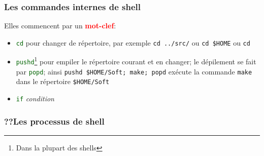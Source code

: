 \documentclass[lualatex,11pt,a4paper,svgnames,french]{beamer}
\newcommand{\clbrougras}[1]{{\textcolor{Red}{\textbf{#1}}}}
\newcommand{\clbshell}[1]{{\textcolor{DarkGreen}{\texttt{#1}}}}
\begin{document}
\begin{frame}\frametitle{Les commandes internes de shell}
  Elles commencent par un \clbrougras{mot-clef}:
  \begin{itemize}
  \item \clbshell{cd} pour changer de répertoire, par exemple
    \texttt{cd ../src/} ou \texttt{cd \$HOME} ou \texttt{cd ~}
    \item \clbshell{pushd}\footnote{Dans la plupart des shells} pour
      empiler le répertoire courant et en changer; le dépilement se
      fait par \clbshell{popd}; ainsi \texttt{pushd \$HOME/Soft; make;
        popd} exécute la commande \texttt{make} dans le répertoire
      \texttt{\$HOME/Soft}
  \item \clbshell{if} \textit{condition}
  \end{itemize}
  
  {}
\end{frame}
\begin{frame}\frametitle{??Les processus de shell}

  
  {}
\end{frame}
\end{document}
